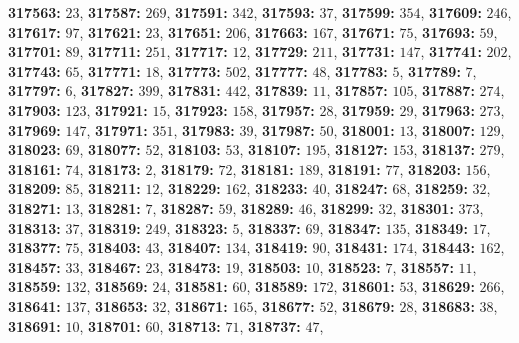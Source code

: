 \textsf{\bfseries 317563:} $23$, \textsf{\bfseries 317587:} $269$, \textsf{\bfseries 317591:} $342$, \textsf{\bfseries 317593:} $37$, \textsf{\bfseries 317599:} $354$, \textsf{\bfseries 317609:} $246$, \textsf{\bfseries 317617:} $97$, \textsf{\bfseries 317621:} $23$, \textsf{\bfseries 317651:} $206$, \textsf{\bfseries 317663:} $167$, \textsf{\bfseries 317671:} $75$, \textsf{\bfseries 317693:} $59$, \textsf{\bfseries 317701:} $89$, \textsf{\bfseries 317711:} $251$, \textsf{\bfseries 317717:} $12$, \textsf{\bfseries 317729:} $211$, \textsf{\bfseries 317731:} $147$, \textsf{\bfseries 317741:} $202$, \textsf{\bfseries 317743:} $65$, \textsf{\bfseries 317771:} $18$, \textsf{\bfseries 317773:} $502$, \textsf{\bfseries 317777:} $48$, \textsf{\bfseries 317783:} $5$, \textsf{\bfseries 317789:} $7$, \textsf{\bfseries 317797:} $6$, \textsf{\bfseries 317827:} $399$, \textsf{\bfseries 317831:} $442$, \textsf{\bfseries 317839:} $11$, \textsf{\bfseries 317857:} $105$, \textsf{\bfseries 317887:} $274$, \textsf{\bfseries 317903:} $123$, \textsf{\bfseries 317921:} $15$, \textsf{\bfseries 317923:} $158$, \textsf{\bfseries 317957:} $28$, \textsf{\bfseries 317959:} $29$, \textsf{\bfseries 317963:} $273$, \textsf{\bfseries 317969:} $147$, \textsf{\bfseries 317971:} $351$, \textsf{\bfseries 317983:} $39$, \textsf{\bfseries 317987:} $50$, \textsf{\bfseries 318001:} $13$, \textsf{\bfseries 318007:} $129$, \textsf{\bfseries 318023:} $69$, \textsf{\bfseries 318077:} $52$, \textsf{\bfseries 318103:} $53$, \textsf{\bfseries 318107:} $195$, \textsf{\bfseries 318127:} $153$, \textsf{\bfseries 318137:} $279$, \textsf{\bfseries 318161:} $74$, \textsf{\bfseries 318173:} $2$, \textsf{\bfseries 318179:} $72$, \textsf{\bfseries 318181:} $189$, \textsf{\bfseries 318191:} $77$, \textsf{\bfseries 318203:} $156$, \textsf{\bfseries 318209:} $85$, \textsf{\bfseries 318211:} $12$, \textsf{\bfseries 318229:} $162$, \textsf{\bfseries 318233:} $40$, \textsf{\bfseries 318247:} $68$, \textsf{\bfseries 318259:} $32$, \textsf{\bfseries 318271:} $13$, \textsf{\bfseries 318281:} $7$, \textsf{\bfseries 318287:} $59$, \textsf{\bfseries 318289:} $46$, \textsf{\bfseries 318299:} $32$, \textsf{\bfseries 318301:} $373$, \textsf{\bfseries 318313:} $37$, \textsf{\bfseries 318319:} $249$, \textsf{\bfseries 318323:} $5$, \textsf{\bfseries 318337:} $69$, \textsf{\bfseries 318347:} $135$, \textsf{\bfseries 318349:} $17$, \textsf{\bfseries 318377:} $75$, \textsf{\bfseries 318403:} $43$, \textsf{\bfseries 318407:} $134$, \textsf{\bfseries 318419:} $90$, \textsf{\bfseries 318431:} $174$, \textsf{\bfseries 318443:} $162$, \textsf{\bfseries 318457:} $33$, \textsf{\bfseries 318467:} $23$, \textsf{\bfseries 318473:} $19$, \textsf{\bfseries 318503:} $10$, \textsf{\bfseries 318523:} $7$, \textsf{\bfseries 318557:} $11$, \textsf{\bfseries 318559:} $132$, \textsf{\bfseries 318569:} $24$, \textsf{\bfseries 318581:} $60$, \textsf{\bfseries 318589:} $172$, \textsf{\bfseries 318601:} $53$, \textsf{\bfseries 318629:} $266$, \textsf{\bfseries 318641:} $137$, \textsf{\bfseries 318653:} $32$, \textsf{\bfseries 318671:} $165$, \textsf{\bfseries 318677:} $52$, \textsf{\bfseries 318679:} $28$, \textsf{\bfseries 318683:} $38$, \textsf{\bfseries 318691:} $10$, \textsf{\bfseries 318701:} $60$, \textsf{\bfseries 318713:} $71$, \textsf{\bfseries 318737:} $47$, 
